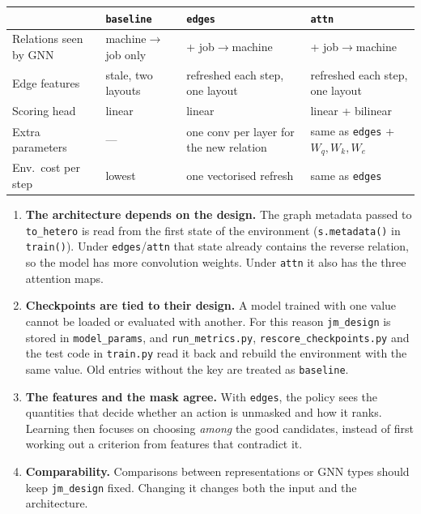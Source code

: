 \documentclass[11pt,a4paper]{article}
\newcommand{\code}[1]{\texttt{#1}}
\theoremstyle{remark}
\begin{document}
\begin{center}
\begin{tabular}{l p{3.3cm} p{3.4cm} p{3.4cm}}
\toprule
 & \code{baseline} & \code{edges} & \code{attn} \\
\midrule
Relations seen by GNN & machine$\to$job only & + job$\to$machine & + job$\to$machine \\
Edge features & stale, two layouts & refreshed each step, one layout & refreshed each step, one layout \\
Scoring head & linear & linear & linear + bilinear \\
Extra parameters & --- & one conv per layer for the new relation & same as \code{edges} + $W_q,W_k,W_e$ \\
Env.\ cost per step & lowest & one vectorised refresh & same as \code{edges} \\
\bottomrule
\end{tabular}
\end{center}

\begin{enumerate}
  \item \textbf{The architecture depends on the design.} The graph metadata passed to
        \code{to\_hetero} is read from the first state of the environment
        (\code{s.metadata()} in \code{train()}). Under \code{edges}/\code{attn} that state
        already contains the reverse relation, so the model has more convolution
        weights. Under \code{attn} it also has the three attention maps.
  \item \textbf{Checkpoints are tied to their design.} A model trained with one value cannot
        be loaded or evaluated with another. For this reason \code{jm\_design} is
        stored in \code{model\_params}, and \code{run\_metrics.py},
        \code{rescore\_checkpoints.py} and the test code in \code{train.py} read it back
        and rebuild the environment with the same value. Old entries without
        the key are treated as \code{baseline}.
  \item \textbf{The features and the mask agree.} With \code{edges}, the policy sees the
        quantities that decide whether an action is unmasked and how it ranks. Learning then
        focuses on choosing \emph{among} the good candidates, instead of first
        working out a criterion from features that contradict it.
  \item \textbf{Comparability.} Comparisons between representations or GNN types should
        keep \code{jm\_design} fixed. Changing it changes both the input
        and the architecture.
\end{enumerate}
\end{document}
